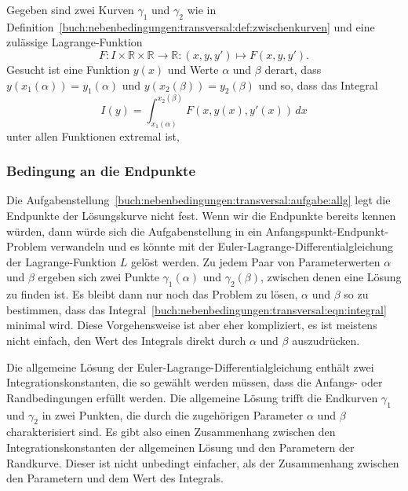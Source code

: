 \begin{aufgabe}
\label{buch:nebenbedingungen:transversal:aufgabe:allg}
Gegeben sind zwei Kurven $\gamma_1$ und $\gamma_2$ wie in
Definition~\ref{buch:nebenbedingungen:transversal:def:zwischenkurven}
und eine zulässige Lagrange-Funktion 
\[
F\colon
I\times \mathbb{R}\times\mathbb{R}\to\mathbb{R}
:
(x,y,y') \mapsto F(x,y,y').
\]
Gesucht ist eine Funktion $y(x)$ und Werte $\alpha$ und $\beta$ derart,
dass $y(x_1(\alpha)) = y_1(\alpha)$ und $y(x_2(\beta))=y_2(\beta)$
und so, dass das Integral
\begin{equation}
I(y)
=
\int_{x_1(\alpha)}^{x_2(\beta)} 
F(x,y(x),y'(x))
\,dx
\label{buch:nebenbedingungen:transversal:eqn:integral}
\end{equation}
unter allen Funktionen extremal ist, 
\end{aufgabe}

%
%
\subsubsection{Bedingung an die Endpunkte}
Die Aufgabenstellung~\ref{buch:nebenbedingungen:transversal:aufgabe:allg}
legt die Endpunkte der Lösungskurve nicht fest.
Wenn wir die Endpunkte bereits kennen würden, dann würde sich die
Aufgabenstellung in ein Anfangs\-punkt-End\-punkt-Problem verwandeln und
es könnte mit der Euler-Lagrange-Differential\-gleichung der Lagrange-Funktion
$L$ gelöst werden.
Zu jedem Paar von Parameterwerten $\alpha$ und $\beta$ ergeben sich
zwei Punkte $\gamma_1(\alpha)$ und $\gamma_2(\beta)$, zwischen denen
eine Lösung zu finden ist.
Es bleibt dann nur noch das Problem zu lösen, $\alpha$ und $\beta$ so
zu bestimmen, dass das
Integral~\eqref{buch:nebenbedingungen:transversal:eqn:integral}
minimal wird.
Diese Vorgehensweise ist aber eher kompliziert, es ist meistens nicht
einfach, den Wert des Integrals direkt durch $\alpha$ und $\beta$
auszudrücken.

Die allgemeine Lösung der Euler-Lagrange-Differentialgleichung enthält
zwei Integrationskonstanten, die so gewählt werden müssen, dass die
Anfangs- oder Randbedingungen erfüllt werden.
Die allgemeine Lösung trifft die Endkurven $\gamma_1$ und $\gamma_2$
in zwei Punkten, die durch die zugehörigen Parameter $\alpha$ und $\beta$
charakterisiert sind.
Es gibt also einen Zusammenhang zwischen den Integrationskonstanten der
allgemeinen Lösung und den Parametern der Randkurve.
Dieser ist nicht unbedingt einfacher, als der Zusammenhang zwischen den
Parametern und dem Wert des Integrals.

